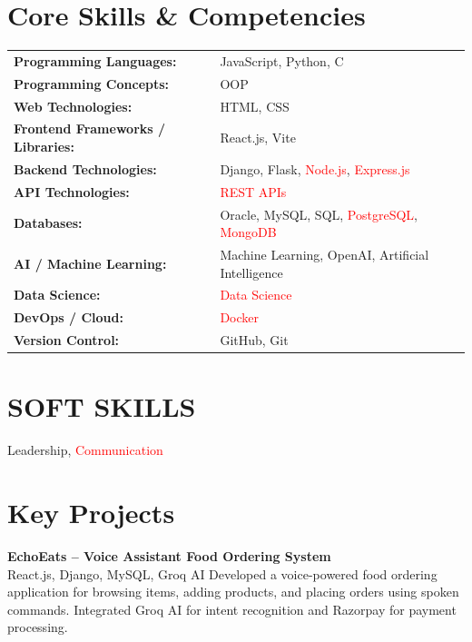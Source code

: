 \documentclass[10pt,a4paper]{article}
\begin{document}
\section*{Core Skills \& Competencies}
\begin{tabular}{@{}p{2.3in}p{4.5in}@{}}
\textbf{Programming Languages:} & JavaScript, Python, C \\
\textbf{Programming Concepts:} & OOP \\
\textbf{Web Technologies:} & HTML, CSS \\
\textbf{Frontend Frameworks / Libraries:} & React.js, Vite \\
\textbf{Backend Technologies:} & Django, Flask, \textcolor{red}{Node.js}, \textcolor{red}{Express.js} \\
\textbf{API Technologies:} & \textcolor{red}{REST APIs} \\
\textbf{Databases:} & Oracle, MySQL, SQL, \textcolor{red}{PostgreSQL}, \textcolor{red}{MongoDB} \\
\textbf{AI / Machine Learning:} & Machine Learning, OpenAI, Artificial Intelligence \\
\textbf{Data Science:} & \textcolor{red}{Data Science} \\
\textbf{DevOps / Cloud:} & \textcolor{red}{Docker} \\
\textbf{Version Control:} & GitHub, Git \\
\end{tabular}

\section*{SOFT SKILLS}
\noindent Leadership, \textcolor{red}{Communication} \vspace{4pt}



\section*{Key Projects}
\noindent \textbf{EchoEats – Voice Assistant Food Ordering System} \\
React.js, Django, MySQL, Groq AI Developed a voice-powered food ordering application for browsing items, adding products, and placing orders using spoken commands. Integrated Groq AI for intent recognition and Razorpay for payment processing. \vspace{4pt}
\end{document}
